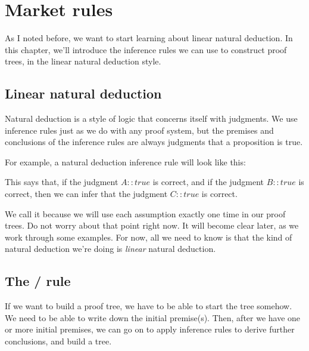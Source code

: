 \documentclass[../../../main.tex]{subfiles}
\begin{document}
\chapter{Market rules}

As I noted before, we want to start learning about linear natural deduction. In this chapter, we'll introduce the inference rules we can use to construct proof trees, in the linear natural deduction style.


\section{Linear natural deduction}

Natural deduction is a style of logic that concerns itself with judgments. We use inference rules just as we do with any proof system, but the premises and conclusions of the inference rules are always judgments that a proposition is true.

For example, a natural deduction inference rule will look like this:

\begin{prooftree*}
\end{prooftree*}

\noindent
This says that, if the judgment $A :: true$ is correct, and if the judgment $B :: true$ is correct, then we can infer that the judgment $C :: true$ is correct.

We call it  because we will use each assumption exactly one time in our proof trees. Do not worry about that point right now. It will become clear later, as we work through some examples. For now, all we need to know is that the kind of natural deduction we're doing is \emph{linear} natural deduction.


\section{The \startrule/ rule}

If we want to build a proof tree, we have to be able to start the tree somehow. We need to be able to write down the initial premise(s). Then, after we have one or more initial premises, we can go on to apply inference rules to derive further conclusions, and build a tree.
\end{document}
